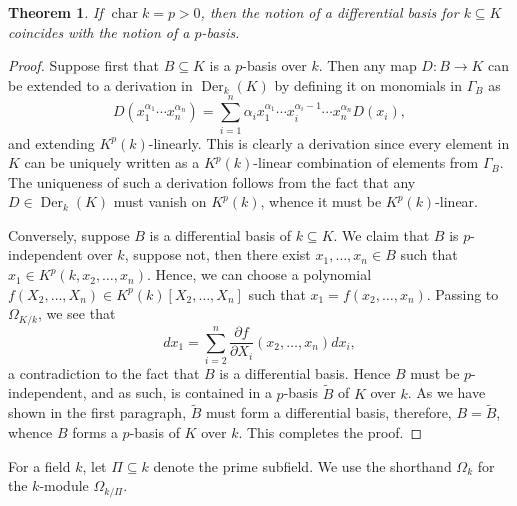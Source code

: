 \documentclass[10pt]{article}
\theoremstyle{thmstyle}
\newtheorem{theorem}{Theorem}[section]
\theoremstyle{defstyle}
\newcommand{\chr}{\operatorname{char}}
\newcommand{\wt}[1]{\widetilde{#1}}
\newcommand{\Der}{\operatorname{Der}}
\begin{document}
\begin{theorem}
    If $\chr k = p > 0$, then the notion of a differential basis for $k\subseteq K$ coincides with the notion of a $p$-basis.
\end{theorem}
\begin{proof}
    Suppose first that $B\subseteq K$ is a $p$-basis over $k$. Then any map $D\colon B\to K$ can be extended to a derivation in $\Der_k(K)$ by defining it on monomials in $\Gamma_B$ as
    \begin{equation*}
        D(x_1^{\alpha_1}\cdots x_n^{\alpha_n}) = \sum_{i = 1}^n \alpha_i x_1^{\alpha_1}\cdots x_i^{\alpha_i - 1}\cdots x_n^{\alpha_n} D(x_i),
    \end{equation*}
    and extending $K^p(k)$-linearly. This is clearly a derivation since every element in $K$ can be uniquely written as a $K^p(k)$-linear combination of elements from $\Gamma_B$. The uniqueness of such a derivation follows from the fact that any $D\in\Der_k(K)$ must vanish on $K^p(k)$, whence it must be $K^p(k)$-linear.

    Conversely, suppose $B$ is a differential basis of $k\subseteq K$. We claim that $B$ is $p$-independent over $k$, suppose not, then there exist $x_1,\dots,x_n\in B$ such that $x_1\in K^p(k, x_2,\dots, x_n)$. Hence, we can choose a polynomial $f(X_2,\dots,X_n)\in K^p(k)[X_2,\dots,X_n]$ such that $x_1 = f(x_2,\dots,x_n)$. Passing to $\Omega_{K/k}$, we see that 
    \begin{equation*}
        dx_1 = \sum_{i = 2}^n \frac{\partial f}{\partial X_i}(x_2,\dots,x_n) dx_i,
    \end{equation*}
    a contradiction to the fact that $B$ is a differential basis. Hence $B$ must be $p$-independent, and as such, is contained in a $p$-basis $\wt B$ of $K$ over $k$. As we have shown in the first paragraph, $\wt B$ must form a differential basis, therefore, $B = \wt B$, whence $B$ forms a $p$-basis of $K$ over $k$. This completes the proof.
\end{proof}

For a field $k$, let $\Pi\subseteq k$ denote the prime subfield. We use the shorthand $\Omega_k$ for the $k$-module $\Omega_{k/\Pi}$.
\end{document}
